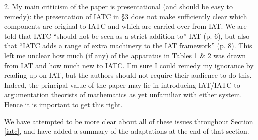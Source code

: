 
\begin{mdframed}[backgroundcolor=orange!10]
2. My main criticism of the paper is presentational (and should be easy to remedy): the presentation of IATC in §3 does not make sufficiently clear which components are original to IATC and which are carried over from IAT.  We are told that IATC ``should not be seen as a strict addition to'' IAT (p. 6), but also that ``IATC adds a range of extra machinery to the IAT framework'' (p. 8).  This left me unclear how much (if any) of the apparatus in Tables 1 \& 2 was drawn from IAT and how much new to IATC. I'm sure I could remedy my ignorance by reading up on IAT, but the authors should not require their audience to do this. Indeed, the principal value of the paper may lie in introducing IAT/IATC to argumentation theorists of mathematics as yet unfamiliar with either system. Hence it is important to get this right.
\end{mdframed}

We have attempted to be more clear about all of these issues
throughout Section \ref{iatc}, and have added a summary of the adaptations
at the end of that section.







